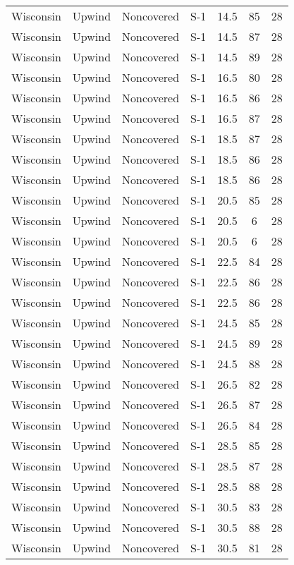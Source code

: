 \documentclass{article}
\begin{document}
\begin{longtable}[H]{ccccccc}
Wisconsin & Upwind   & Noncovered & S-1 & 14.5 & 85  & 28 \\
Wisconsin & Upwind   & Noncovered & S-1 & 14.5 & 87  & 28 \\
Wisconsin & Upwind   & Noncovered & S-1 & 14.5 & 89  & 28 \\
Wisconsin & Upwind   & Noncovered & S-1 & 16.5 & 80  & 28 \\
Wisconsin & Upwind   & Noncovered & S-1 & 16.5 & 86  & 28 \\
Wisconsin & Upwind   & Noncovered & S-1 & 16.5 & 87  & 28 \\
Wisconsin & Upwind   & Noncovered & S-1 & 18.5 & 87  & 28 \\
Wisconsin & Upwind   & Noncovered & S-1 & 18.5 & 86  & 28 \\
Wisconsin & Upwind   & Noncovered & S-1 & 18.5 & 86  & 28 \\
Wisconsin & Upwind   & Noncovered & S-1 & 20.5 & 85  & 28 \\
Wisconsin & Upwind   & Noncovered & S-1 & 20.5 & 6   & 28 \\
Wisconsin & Upwind   & Noncovered & S-1 & 20.5 & 6   & 28 \\
Wisconsin & Upwind   & Noncovered & S-1 & 22.5 & 84  & 28 \\
Wisconsin & Upwind   & Noncovered & S-1 & 22.5 & 86  & 28 \\
Wisconsin & Upwind   & Noncovered & S-1 & 22.5 & 86  & 28 \\
Wisconsin & Upwind   & Noncovered & S-1 & 24.5 & 85  & 28 \\
Wisconsin & Upwind   & Noncovered & S-1 & 24.5 & 89  & 28 \\
Wisconsin & Upwind   & Noncovered & S-1 & 24.5 & 88  & 28 \\
Wisconsin & Upwind   & Noncovered & S-1 & 26.5 & 82  & 28 \\
Wisconsin & Upwind   & Noncovered & S-1 & 26.5 & 87  & 28 \\
Wisconsin & Upwind   & Noncovered & S-1 & 26.5 & 84  & 28 \\
Wisconsin & Upwind   & Noncovered & S-1 & 28.5 & 85  & 28 \\
Wisconsin & Upwind   & Noncovered & S-1 & 28.5 & 87  & 28 \\
Wisconsin & Upwind   & Noncovered & S-1 & 28.5 & 88  & 28 \\
Wisconsin & Upwind   & Noncovered & S-1 & 30.5 & 83  & 28 \\
Wisconsin & Upwind   & Noncovered & S-1 & 30.5 & 88  & 28 \\
Wisconsin & Upwind   & Noncovered & S-1 & 30.5 & 81  & 28 \\
\hline
\end{longtable}









\pagebreak
\end{document}
